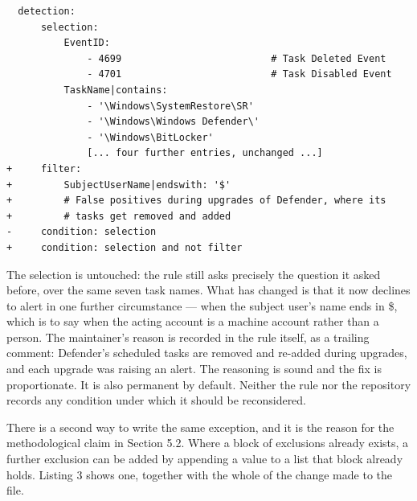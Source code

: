 \begin{listing}[htbp]
\caption{A predicate-level exclusion. Rule win\_security\_susp\_scheduled\_task\_delete.yml (UUID 7595ba94-cf3b-4471-aa03-4f6baa9e5fad) at commit 356ab98a, 9 December 2022, committed by Florian Roth with the message ``fix: FPs with Important Scheduled Task Deleted''. Unmarked lines are unchanged context. Four TaskName entries are elided at the mark, and the author's trailing comment is reflowed onto two lines; nothing else is altered.}
\label{listing:2}
\begin{lstlisting}
  detection:
      selection:
          EventID:
              - 4699                          # Task Deleted Event
              - 4701                          # Task Disabled Event
          TaskName|contains:
              - '\Windows\SystemRestore\SR'
              - '\Windows\Windows Defender\'
              - '\Windows\BitLocker'
              [... four further entries, unchanged ...]
+     filter:
+         SubjectUserName|endswith: '$'
+         # False positives during upgrades of Defender, where its
+         # tasks get removed and added
-     condition: selection
+     condition: selection and not filter
\end{lstlisting}
\end{listing}

The selection is untouched: the rule still asks precisely the question it asked before, over the same seven task names. What has changed is that it now declines to alert in one further circumstance --- when the subject user's name ends in \$, which is to say when the acting account is a machine account rather than a person. The maintainer's reason is recorded in the rule itself, as a trailing comment: Defender's scheduled tasks are removed and re-added during upgrades, and each upgrade was raising an alert. The reasoning is sound and the fix is proportionate. It is also permanent by default. Neither the rule nor the repository records any condition under which it should be reconsidered.

There is a second way to write the same exception, and it is the reason for the methodological claim in Section 5.2. Where a block of exclusions already exists, a further exclusion can be added by appending a value to a list that block already holds. Listing 3 shows one, together with the whole of the change made to the file.

